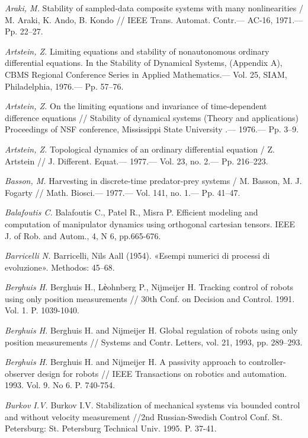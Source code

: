 \begin{thebibliography}{10}
	{\it Araki, M.} Stability of sampled-data composite systems with many nonlinearities / M. Araki, K. Ando, B. Kondo // IEEE Trans. Automat. Contr.— AC-16, 1971.— Pp. 22–27.
	
	{\it Artstein, Z.} Limiting equations and stability of nonautonomous ordinary differential equations. In the Stability of Dynamical Systems, (Appendix A), CBMS Regional Conference Series in Applied Mathematics.— Vol. 25, SIAM, Philadelphia, 1976.— Pp. 57–76.
	
	{\it Artstein, Z.} On the limiting equations and invariance of time-dependent difference equations // Stability of dynamical systems (Theory and applications) Proceedings of NSF conference, Mississippi State University .— 1976.— Pp. 3–9.
	
	{\it Artstein, Z.} Topological dynamics of an ordinary differential equation / Z. Artstein // J.
	Different. Equat.— 1977.— Vol. 23, no. 2.— Pp. 216–223.
	
	{\it Basson, M.} Harvesting in discrete-time predator-prey systems / M. Basson, M. J. Fogarty // Math. Biosci.— 1977.— Vol. 141, no. 1.— Pp. 41–47.
	
	{\it Balafoutis C.} Balafoutis C., Patel R., Misra P. Efficient modeling and computation of manipulator dynamics using orthogonal cartesian tensors. IEEE J. of Rob. and Autom., 4, N 6, pp.665-676.
	
	{\it Barricelli N.} Barricelli, Nils Aall (1954). «Esempi numerici di processi di evoluzione». Methodos: 45–68.
	
	{\it Berghuis H.} Berghuis H., Lѐohnberg P., Nijmeijer H. Tracking control of robots using only position measurements // 30th Conf. on Decision and Control. 1991. Vol. 1. P. 1039-1040.
	
	{\it Berghuis H.} Berghuis H. and Nijmeijer H. Global regulation of robots using only position measurements // Systems and Contr. Letters, vol. 21, 1993, pp. 289–293. 
	
	{\it Berghuis H.} Berghuis H. and Nijmeijer H. A passivity approach to controller-observer design for robots // IEEE Transactions on robotics and automation. 1993. Vol. 9. No 6. P. 740-754.
	
	{\it Burkov I.V.} Burkov I.V. Stabilization of mechanical systems via bounded control and without velocity measurement //2nd Russian-Swedish Control Conf. St. Petersburg: St. Petersburg Technical Univ. 1995. P. 37-41.
	

\end{thebibliography}
